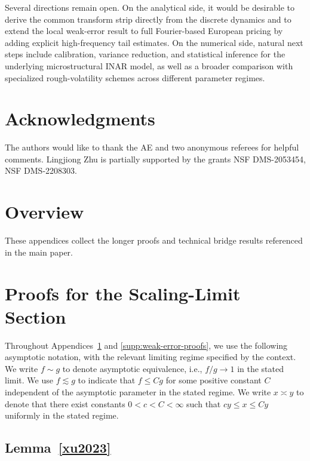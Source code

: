 \documentclass[letterpaper]{article}
\numberwithin{equation}{section}
\theoremstyle{definition}
\theoremstyle{remark}
\begin{document}
Several directions remain open. On the analytical side, it would be desirable to derive the common transform strip directly from the discrete dynamics and to extend the local weak-error result to full Fourier-based European pricing by adding explicit high-frequency tail estimates. On the numerical side, natural next steps include calibration, variance reduction, and statistical inference for the underlying microstructural INAR model, as well as a broader comparison with specialized rough-volatility schemes across different parameter regimes.

\section*{Acknowledgments}

The authors would like to thank the AE and two anonymous referees for helpful comments. Lingjiong Zhu is partially supported by the grants NSF DMS-2053454, NSF DMS-2208303. 




\appendix

\section*{Overview}
These appendices collect the longer proofs and technical bridge results referenced in the main paper.

\section{Proofs for the Scaling-Limit Section}
\label{supp:scaling-proofs}

Throughout Appendices~\ref{supp:scaling-proofs} and \ref{supp:weak-error-proofs}, we use the following asymptotic notation, with the relevant limiting regime specified by the context. We write $f \sim g$ to denote asymptotic equivalence, i.e., $f/g\to 1$ in the stated limit. We use $f \lesssim g$ to indicate that $f \le C g$ for some positive constant $C$ independent of the asymptotic parameter in the stated regime. We write $x \asymp y$ to denote that there exist constants $0<c<C<\infty$
such that $cy \le x \le Cy$ uniformly in the stated regime.


\subsection{Lemma~\ref{xu2023}}
\end{document}
